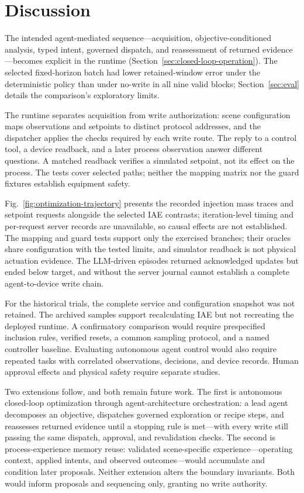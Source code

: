 \section{Discussion}
\label{sec:discussion}
The intended agent-mediated sequence---acquisition, objective-conditioned analysis, typed intent, governed dispatch, and reassessment of returned evidence---becomes explicit in the runtime (Section~\ref{sec:closed-loop-operation}). The selected fixed-horizon batch had lower retained-window error under the deterministic policy than under no-write in all nine valid blocks; Section~\ref{sec:eval} details the comparison's exploratory limits.

The runtime separates acquisition from write authorization: scene configuration maps observations and setpoints to distinct protocol addresses, and the dispatcher applies the checks required by each write route. The reply to a control tool, a device readback, and a later process observation answer different questions. A matched readback verifies a simulated setpoint, not its effect on the process. The tests cover selected paths; neither the mapping matrix nor the guard fixtures establish equipment safety.

Fig.~\ref{fig:optimization-trajectory} presents the recorded injection mass traces and setpoint requests alongside the selected IAE contrasts; iteration-level timing and per-request server records are unavailable, so causal effects are not established. The mapping and guard tests support only the exercised branches; their oracles share configuration with the tested limits, and simulator readback is not physical actuation evidence. The LLM-driven episodes returned acknowledged updates but ended below target, and without the server journal cannot establish a complete agent-to-device write chain.

For the historical trials, the complete service and configuration snapshot was not retained. The archived samples support recalculating IAE but not recreating the deployed runtime. A confirmatory comparison would require prespecified inclusion rules, verified resets, a common sampling protocol, and a named controller baseline. Evaluating autonomous agent control would also require repeated tasks with correlated observations, decisions, and device records. Human approval effects and physical safety require separate studies.

Two extensions follow, and both remain future work. The first is autonomous closed-loop optimization through agent-architecture orchestration: a lead agent decomposes an objective, dispatches governed exploration or recipe steps, and reassesses returned evidence until a stopping rule is met---with every write still passing the same dispatch, approval, and revalidation checks. The second is process-experience memory reuse: validated scene-specific experience---operating context, applied intents, and observed outcomes---would accumulate and condition later proposals. Neither extension alters the boundary invariants. Both would inform proposals and sequencing only, granting no write authority.

